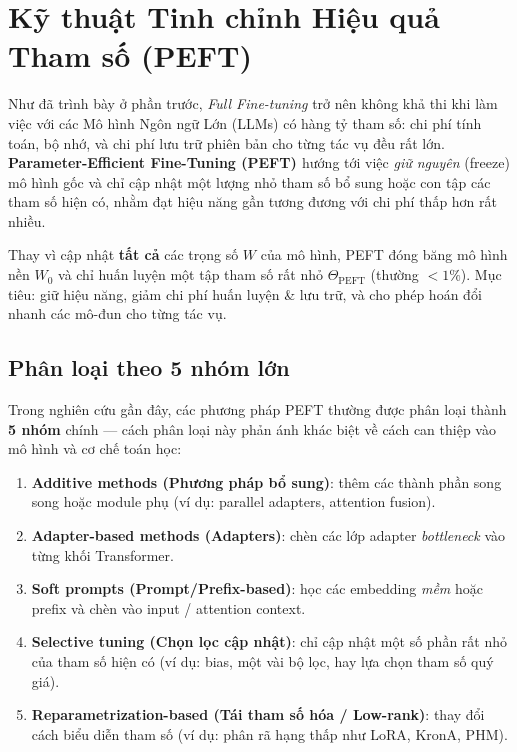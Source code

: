 
\section{Kỹ thuật Tinh chỉnh Hiệu quả Tham số (PEFT)}
\label{sec:peft}

Như đã trình bày ở phần trước, \textit{Full Fine-tuning} trở nên không khả thi khi làm việc với các Mô hình Ngôn ngữ Lớn (LLMs) có hàng tỷ tham số: chi phí tính toán, bộ nhớ, và chi phí lưu trữ phiên bản cho từng tác vụ đều rất lớn.  
\textbf{Parameter-Efficient Fine-Tuning (PEFT) \cite{houlsby2019parameter, hu2021lora, lester2021power, zaken2021bitfit}} hướng tới việc \emph{giữ nguyên} (freeze) mô hình gốc và chỉ cập nhật một lượng nhỏ tham số bổ sung hoặc con tập các tham số hiện có, nhằm đạt hiệu năng gần tương đương với chi phí thấp hơn rất nhiều.

\begin{tcolorbox}[
	title=Triết lý của PEFT,
	colback=green!5!white, colframe=green!60!black, fonttitle=\bfseries
	]
	Thay vì cập nhật \textbf{tất cả} các trọng số $W$ của mô hình, PEFT đóng băng mô hình nền $W_0$ và chỉ huấn luyện một tập tham số rất nhỏ $\Theta_{\mathrm{PEFT}}$ (thường $<1\%$). Mục tiêu: giữ hiệu năng, giảm chi phí huấn luyện \& lưu trữ, và cho phép hoán đổi nhanh các mô-đun cho từng tác vụ.
\end{tcolorbox}

\subsection{Phân loại theo 5 nhóm lớn}
\label{ssec:peft_taxonomy}
Trong nghiên cứu gần đây, các phương pháp PEFT thường được phân loại thành \textbf{5 nhóm}\cite{he2022towards, hu2023llmpeft, dettmers2023qlora} chính — cách phân loại này phản ánh khác biệt về cách can thiệp vào mô hình và cơ chế toán học:

\begin{enumerate}
	\item \textbf{Additive methods (Phương pháp bổ sung)}: thêm các thành phần song song hoặc module phụ (ví dụ: parallel adapters, attention fusion).
	\item \textbf{Adapter-based methods (Adapters)}: chèn các lớp adapter \emph{bottleneck} vào từng khối Transformer.
	\item \textbf{Soft prompts (Prompt/Prefix-based)}: học các embedding \emph{mềm} hoặc prefix và chèn vào input / attention context.
	\item \textbf{Selective tuning (Chọn lọc cập nhật)}: chỉ cập nhật một số phần rất nhỏ của tham số hiện có (ví dụ: bias, một vài bộ lọc, hay lựa chọn tham số quý giá).
	\item \textbf{Reparametrization-based (Tái tham số hóa / Low-rank)}: thay đổi cách biểu diễn tham số (ví dụ: phân rã hạng thấp như LoRA, KronA, PHM).
\end{enumerate}

